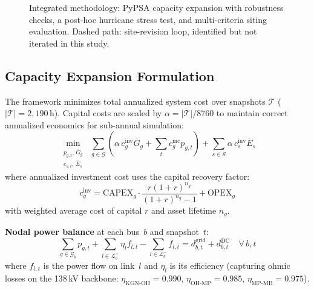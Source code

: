 \documentclass[conference,10pt]{IEEEtran}
\begin{document}
\begin{figure}[!t]
{}
\caption{Integrated methodology: PyPSA capacity expansion with robustness checks, a post-hoc hurricane stress test, and multi-criteria siting evaluation. Dashed path: site-revision loop, identified but not iterated in this study.}
\label{fig:workflow}
\end{figure}

\subsection{Capacity Expansion Formulation}

The framework minimizes total annualized system cost over snapshots $\mathcal{T}$ ($|\mathcal{T}| = 2{,}190$\,h). Capital costs are scaled by $\alpha = |\mathcal{T}|/8760$ to maintain correct annualized economics for sub-annual simulation:
\begin{equation}
\min_{\substack{p_{g,t},\, \bar{G}_g \\ e_{s,t},\, \bar{E}_s}} \;\sum_{g \in \mathcal{G}} \left(\alpha\, c_g^{\text{inv}} \bar{G}_g + \sum_{t} c_g^{\text{mc}} p_{g,t}\right) + \sum_{s \in \mathcal{S}} \alpha\, c_s^{\text{inv}} \bar{E}_s
\label{eq:obj}
\end{equation}
where annualized investment cost uses the capital recovery factor:
\begin{equation}
c_g^{\text{inv}} = \text{CAPEX}_g \cdot \frac{r(1+r)^{n_g}}{(1+r)^{n_g}-1} + \text{OPEX}_g
\label{eq:crf}
\end{equation}
with weighted average cost of capital $r$ and asset lifetime $n_g$.

\noindent\textbf{Nodal power balance} at each bus~$b$ and snapshot~$t$:
\begin{equation}
\sum_{g \in \mathcal{G}_b} p_{g,t} + \sum_{l \in \mathcal{L}_b^{+}} \eta_l f_{l,t} - \sum_{l \in \mathcal{L}_b^{-}} f_{l,t} = d_{b,t}^{\text{grid}} + d_{b,t}^{\text{DC}} \quad \forall\, b,t
\label{eq:balance}
\end{equation}
where $f_{l,t}$ is the power flow on link~$l$ and $\eta_l$ is its efficiency (capturing ohmic losses on the 138\,kV backbone: $\eta_{\text{KGN-OH}}=0.990$, $\eta_{\text{OH-MP}}=0.985$, $\eta_{\text{MP-MB}}=0.975$).
\end{document}
